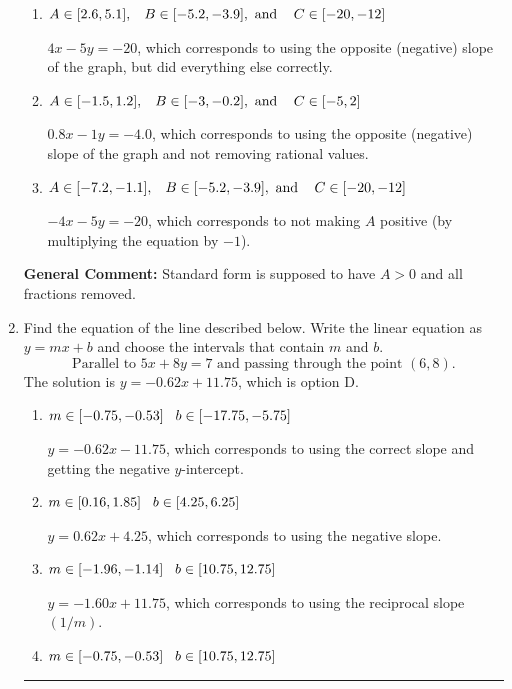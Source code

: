\documentclass{extbook}[14pt]
\newcommand{\litem}[1]{\item #1

\rule{\textwidth}{0.4pt}}
\begin{document}
\begin{enumerate}
{\begin{enumerate}[label=\Alph*.]
* $4x + 5y = 20$, which is the correct option.
\item \( A \in [2.6, 5.1], \hspace{3mm} B \in [-5.2, -3.9], \text{ and } \hspace{3mm} C \in [-20, -12] \)

 $4x - 5y = -20$, which corresponds to using the opposite (negative) slope of the graph, but did everything else correctly.
\item \( A \in [-1.5, 1.2], \hspace{3mm} B \in [-3, -0.2], \text{ and } \hspace{3mm} C \in [-5, 2] \)

 $0.8x - 1y = -4.0$, which corresponds to using the opposite (negative) slope of the graph and not removing rational values.
\item \( A \in [-7.2, -1.1], \hspace{3mm} B \in [-5.2, -3.9], \text{ and } \hspace{3mm} C \in [-20, -12] \)

 $-4x - 5y = -20$, which corresponds to not making $A$ positive (by multiplying the equation by $-1$).
\end{enumerate}

\textbf{General Comment:} Standard form is supposed to have $A > 0$ and all fractions removed.
}
\litem{
Find the equation of the line described below. Write the linear equation as $ y=mx+b $ and choose the intervals that contain $m$ and $b$.
\[ \text{Parallel to } 5 x + 8 y = 7 \text{ and passing through the point } (6, 8). \]
The solution is \( y = -0.62x + 11.75 \), which is option D.\begin{enumerate}[label=\Alph*.]
\item \( m \in [-0.75, -0.53] \hspace*{3mm} b \in [-17.75, -5.75] \)

 $y = -0.62x - 11.75$, which corresponds to using the correct slope and getting the negative $y$-intercept.
\item \( m \in [0.16, 1.85] \hspace*{3mm} b \in [4.25, 6.25] \)

 $y = 0.62x + 4.25$, which corresponds to using the negative slope.
\item \( m \in [-1.96, -1.14] \hspace*{3mm} b \in [10.75, 12.75] \)

 $y = -1.60x + 11.75$, which corresponds to using the reciprocal slope $(1/m)$.
\item \( m \in [-0.75, -0.53] \hspace*{3mm} b \in [10.75, 12.75] \)


\end{enumerate}}
\end{enumerate}
\end{document}

